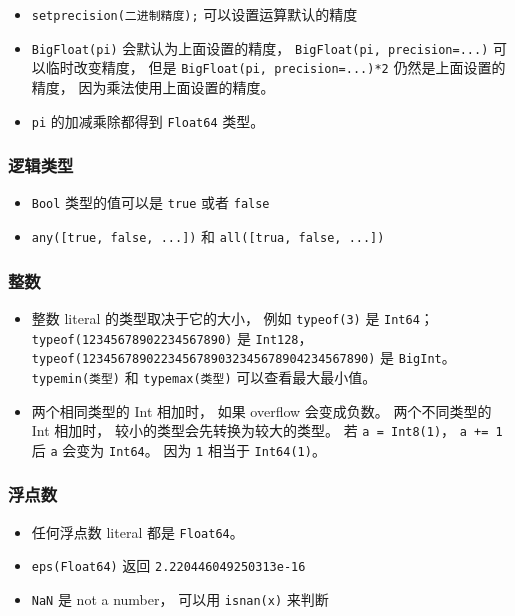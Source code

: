 \begin{itemize}
\item \verb`setprecision(二进制精度);` 可以设置运算默认的精度
\item \verb`BigFloat(pi)` 会默认为上面设置的精度， \verb`BigFloat(pi, precision=...)` 可以临时改变精度， 但是 \verb`BigFloat(pi, precision=...)*2` 仍然是上面设置的精度， 因为乘法使用上面设置的精度。
\item \verb`pi` 的加减乘除都得到 \verb`Float64` 类型。
\end{itemize}


\subsubsection{逻辑类型}
\begin{itemize}
\item \verb`Bool` 类型的值可以是 \verb`true` 或者 \verb`false`
\item \verb`any([true, false, ...])` 和 \verb`all([trua, false, ...])`
\end{itemize}

\subsubsection{整数}
\begin{itemize}
\item 整数 literal 的类型取决于它的大小， 例如 \verb`typeof(3)` 是 \verb`Int64`； \verb`typeof(12345678902234567890)` 是 \verb`Int128`， \verb`typeof(1234567890223456789032345678904234567890)` 是 \verb`BigInt`。 \verb`typemin(类型)` 和 \verb`typemax(类型)` 可以查看最大最小值。
\item 两个相同类型的 Int 相加时， 如果 overflow 会变成负数。 两个不同类型的 Int 相加时， 较小的类型会先转换为较大的类型。 若 \verb`a = Int8(1)`， \verb`a += 1` 后 \verb`a` 会变为 \verb`Int64`。 因为 \verb`1` 相当于 \verb`Int64(1)`。
\end{itemize}

\subsubsection{浮点数}
\begin{itemize}
\item 任何浮点数 literal 都是 \verb`Float64`。
\item \verb`eps(Float64)` 返回 \verb`2.220446049250313e-16`
\item \verb`NaN` 是 not a number， 可以用 \verb`isnan(x)` 来判断
\end{itemize}

